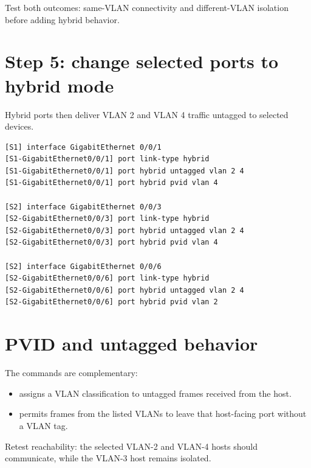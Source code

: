 \begin{verification}
Test both outcomes: same-VLAN connectivity and different-VLAN isolation before adding hybrid behavior.
\end{verification}

\section{Step 5: change selected ports to hybrid mode}
Hybrid ports then deliver VLAN 2 and VLAN 4 traffic untagged to selected devices.
\begin{lstlisting}[style=utpterminal]
[S1] interface GigabitEthernet 0/0/1
[S1-GigabitEthernet0/0/1] port link-type hybrid
[S1-GigabitEthernet0/0/1] port hybrid untagged vlan 2 4
[S1-GigabitEthernet0/0/1] port hybrid pvid vlan 4

[S2] interface GigabitEthernet 0/0/3
[S2-GigabitEthernet0/0/3] port link-type hybrid
[S2-GigabitEthernet0/0/3] port hybrid untagged vlan 2 4
[S2-GigabitEthernet0/0/3] port hybrid pvid vlan 4

[S2] interface GigabitEthernet 0/0/6
[S2-GigabitEthernet0/0/6] port link-type hybrid
[S2-GigabitEthernet0/0/6] port hybrid untagged vlan 2 4
[S2-GigabitEthernet0/0/6] port hybrid pvid vlan 2
\end{lstlisting}

\section{PVID and untagged behavior}
The commands are complementary:
\begin{itemize}
\item {} assigns a VLAN classification to untagged frames received from the host.
\item {} permits frames from the listed VLANs to leave that host-facing port without a VLAN tag.
\end{itemize}
Retest reachability: the selected VLAN-2 and VLAN-4 hosts should communicate, while the VLAN-3 host remains isolated.

